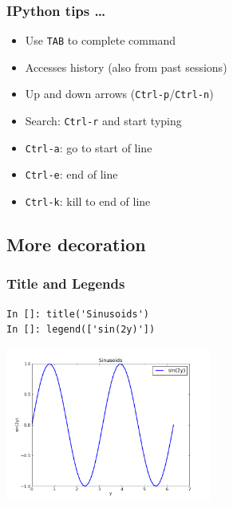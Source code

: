 \documentclass[14pt,compress]{beamer}
\newcommand{\typ}[1]{\lstinline{#1}}
\begin{document}
\begin{frame}[fragile]
\frametitle{IPython tips \ldots}

\begin{itemize}
    \item Use \typ{TAB} to complete command 
\end{itemize}
        \vspace*{0.5in}

        {\Large {}}
\begin{itemize}
    \item Accesses history (also from past sessions)

    \item Up and down arrows (\typ{Ctrl-p}/\typ{Ctrl-n})

    \item Search: \typ{Ctrl-r} and start typing

    \item \typ{Ctrl-a}: go to start of line

    \item \typ{Ctrl-e}: end of line

    \item \typ{Ctrl-k}: kill to end of line
\end{itemize}

\end{frame}


\subsection{More decoration}
\begin{frame}[fragile]
\frametitle{Title and Legends}
\vspace*{-0.15in}
\begin{lstlisting}
In []: title('Sinusoids')
In []: legend(['sin(2y)'])
\end{lstlisting}
  \vspace*{-0.1in}
  \begin{center}
  \includegraphics[height=2in, interpolate=true]{data/legend}  
  \end{center}
\end{frame}
\end{document}
